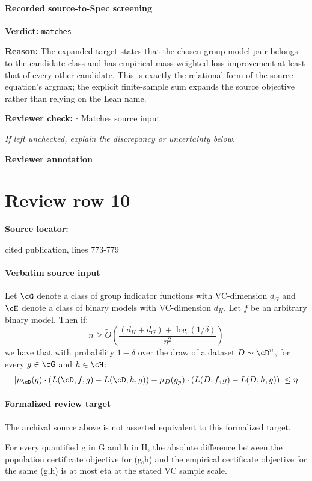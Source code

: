 \documentclass[10pt]{article}
\newcommand{\reviewerbox}{%
  \par\noindent\fbox{\parbox{0.96\linewidth}{\rule{0pt}{0.38in}}}\par
}
\newcommand{\reviewmatch}[1]{%
  \par\noindent\textbf{Reviewer check:} $\square$\; #1\par
  \noindent\emph{If left unchecked, explain the discrepancy or uncertainty below.}\par
}
\begin{document}
\paragraph{Recorded source-to-Spec screening}
\textbf{Verdict:} \texttt{matches}
\\
{\raggedright
\textbf{Reason:} The expanded target states that the chosen group-\allowbreak{}model pair belongs to the candidate class and has empirical mass-\allowbreak{}weighted loss improvement at least that of every other candidate.\allowbreak{} This is exactly the relational form of the source equation's argmax;\allowbreak{} the explicit finite-\allowbreak{}sample sum expands the source objective rather than relying on the Lean name.\allowbreak{}
\par}
\reviewmatch{Matches source input}
\noindent\textbf{Reviewer annotation}\par
\reviewerbox
\clearpage
\hypertarget{source-claim-71e119857b264f9f}{}
\section*{Review row 10}
\textbf{Source locator:} {\footnotesize\raggedright cited publication, lines 773-\allowbreak{}779\par}
\paragraph{Verbatim source input}
\begin{ReviewVerbatim}
\begin{lemma}
\label{lem:samplecomplexity}
Let $\cG$ denote a class of group indicator functions with VC-dimension $d_G$ and $\cH$ denote a class of binary models with VC-dimension $d_H$.  Let $f$ be an arbitrary binary model. Then if:
 $$n \geq \tilde O\left(\frac{(d_H + d_G) + \log(1/\delta)}{\eta^2} \right)$$
 we have that with probability $1-\delta$ over the draw of a dataset $D \sim \cD^n$, for every $g \in \cG$ and $h \in \cH$:
 $$\left|\mu_{\cD}(g)\cdot (L(\cD,f,g) - L(\cD,h,g)) - \mu_{D}(g_p)\cdot (L(D,f,g) - L(D,h,g)) \right| \leq \eta$$
\end{lemma}
\end{ReviewVerbatim}


\paragraph{Formalized review target}
The archival source above is not asserted equivalent to this formalized target.
\begin{ReviewVerbatim}
For every quantified g in G and h in H, the absolute difference between the population certificate objective for (g,h) and the empirical certificate objective for the same (g,h) is at most eta at the stated VC sample scale.
\end{ReviewVerbatim}
\end{document}

